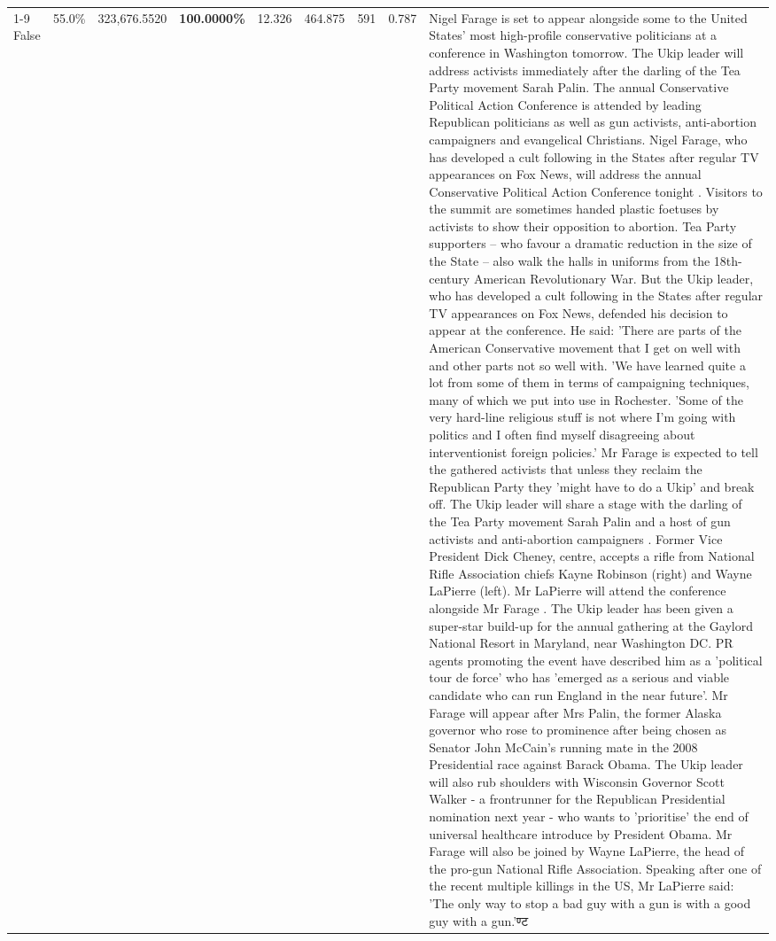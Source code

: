\begin{table}[H]
\begin{tabular}{lllrlllll}
\cline{1-9}
False & 55.0\% & 323,676.5520 & \bfseries \color{red} 100.0000\% & 12.326 & 464.875 & 591 & 0.787 & Nigel Farage is set to appear alongside some to the United States' most high-profile conservative politicians at a conference in Washington tomorrow. The Ukip leader will address activists immediately after the darling of the Tea Party movement Sarah Palin. The annual Conservative Political Action Conference is attended by leading Republican politicians as well as gun activists, anti-abortion campaigners and evangelical Christians. Nigel Farage, who has developed a cult following in the States after regular TV appearances on Fox News, will address the annual Conservative Political Action Conference tonight . Visitors to the summit are sometimes handed plastic foetuses by activists to show their opposition to abortion. Tea Party supporters – who favour a dramatic reduction in the size of the State – also walk the halls in uniforms from the 18th-century American Revolutionary War. But the Ukip leader, who has developed a cult following in the States after regular TV appearances on Fox News, defended his decision to appear at the conference. He said: 'There are parts of the American Conservative movement that I get on well with and other parts not so well with. 'We have learned quite a lot from some of them in terms of campaigning techniques, many of which we put into use in Rochester. 'Some of the very hard-line religious stuff is not where I'm going with politics and I often find myself disagreeing about interventionist foreign policies.' Mr Farage is expected to tell the gathered activists that unless they reclaim the Republican Party they 'might have to do a Ukip' and break off. The Ukip leader will share a stage with the darling of the Tea Party movement Sarah Palin and a host of gun activists and anti-abortion campaigners . Former Vice President Dick Cheney, centre, accepts a rifle from National Rifle Association chiefs Kayne Robinson (right) and Wayne LaPierre (left). Mr LaPierre will attend the conference alongside Mr Farage . The Ukip leader has been given a super-star build-up for the annual gathering at the Gaylord National Resort in Maryland, near Washington DC. PR agents promoting the event have described him as a 'political tour de force' who has 'emerged as a serious and viable candidate who can run England in the near future'. Mr Farage will appear after Mrs Palin, the former Alaska governor who rose to prominence after being chosen as Senator John McCain's running mate in the 2008 Presidential race against Barack Obama. The Ukip leader will also rub shoulders with Wisconsin Governor Scott Walker - a frontrunner for the Republican Presidential nomination next year - who wants to 'prioritise' the end of universal healthcare introduce by President Obama. Mr Farage will also be joined by Wayne LaPierre, the head of the pro-gun National Rifle Association. Speaking after one of the recent multiple killings in the US, Mr LaPierre said: 'The only way to stop a bad guy with a gun is with a good guy with a gun.'ण्ट \\

\end{tabular}
\end{table}
